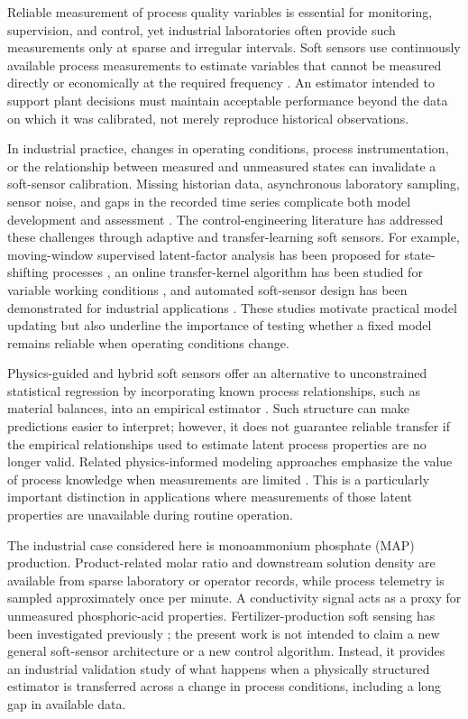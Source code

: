 \documentclass[preprint,12pt,authoryear]{elsarticle}
\begin{document}
Reliable measurement of process quality variables is essential for monitoring, supervision, and control, yet industrial laboratories often provide such measurements only at sparse and irregular intervals. Soft sensors use continuously available process measurements to estimate variables that cannot be measured directly or economically at the required frequency \citep{kadlec2009,souza2016}. An estimator intended to support plant decisions must maintain acceptable performance beyond the data on which it was calibrated, not merely reproduce historical observations.

In industrial practice, changes in operating conditions, process instrumentation, or the relationship between measured and unmeasured states can invalidate a soft-sensor calibration. Missing historian data, asynchronous laboratory sampling, sensor noise, and gaps in the recorded time series complicate both model development and assessment \citep{kadlec2009,offermans2024,dai2025}. The control-engineering literature has addressed these challenges through adaptive and transfer-learning soft sensors. For example, moving-window supervised latent-factor analysis has been proposed for state-shifting processes \citep{yao2017}, an online transfer-kernel algorithm has been studied for variable working conditions \citep{zhang2023cep}, and automated soft-sensor design has been demonstrated for industrial applications \citep{cao2025cep}. These studies motivate practical model updating but also underline the importance of testing whether a fixed model remains reliable when operating conditions change.

Physics-guided and hybrid soft sensors offer an alternative to unconstrained statistical regression by incorporating known process relationships, such as material balances, into an empirical estimator \citep{sansana2021,bradley2022,schweidtmann2024,mousa2025}. Such structure can make predictions easier to interpret; however, it does not guarantee reliable transfer if the empirical relationships used to estimate latent process properties are no longer valid. Related physics-informed modeling approaches emphasize the value of process knowledge when measurements are limited \citep{velioglu2025}. This is a particularly important distinction in applications where measurements of those latent properties are unavailable during routine operation.

The industrial case considered here is monoammonium phosphate (MAP) production. Product-related molar ratio and downstream solution density are available from sparse laboratory or operator records, while process telemetry is sampled approximately once per minute. A conductivity signal acts as a proxy for unmeasured phosphoric-acid properties. Fertilizer-production soft sensing has been investigated previously \citep{fu2007}; the present work is not intended to claim a new general soft-sensor architecture or a new control algorithm. Instead, it provides an industrial validation study of what happens when a physically structured estimator is transferred across a change in process conditions, including a long gap in available data.
\end{document}
